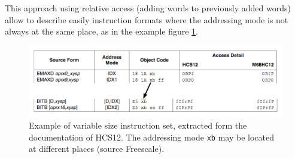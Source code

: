 This approach using relative access (adding words to previously added words) allow to describe easily instruction formats where the addressing mode is not always at the same place, as in the example figure \ref{fig:formatLongueurVariable}.

\begin{figure}		%
  \begin{center}
    \includegraphics[width=0.8 \linewidth]{../common/images/formatLongueurVariable.pdf}
    \caption{Example of variable size instruction set, extracted form the documentation of HCS12. The addressing mode \texttt{xb} may be located at different places (source Freescale).}
    \label{fig:formatLongueurVariable}
  \end{center}
\end{figure}

